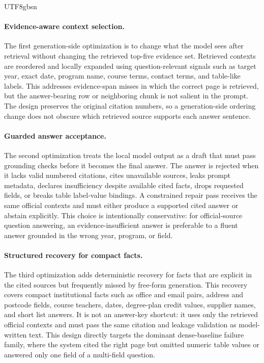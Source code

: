 \documentclass{article}
\begin{document}
\begin{CJK*}{UTF8}{gbsn}
\paragraph{Evidence-aware context selection.}
The first generation-side optimization is to change what the model sees after retrieval without changing the retrieved top-five evidence set. Retrieved contexts are reordered and locally expanded using question-relevant signals such as target year, exact date, program name, course terms, contact terms, and table-like labels. This addresses evidence-span misses in which the correct page is retrieved, but the answer-bearing row or neighboring chunk is not salient in the prompt. The design preserves the original citation numbers, so a generation-side ordering change does not obscure which retrieved source supports each answer sentence.

\paragraph{Guarded answer acceptance.}
The second optimization treats the local model output as a draft that must pass grounding checks before it becomes the final answer. The answer is rejected when it lacks valid numbered citations, cites unavailable sources, leaks prompt metadata, declares insufficiency despite available cited facts, drops requested fields, or breaks table label-value bindings. A constrained repair pass receives the same official contexts and must either produce a supported cited answer or abstain explicitly. This choice is intentionally conservative: for official-source question answering, an evidence-insufficient answer is preferable to a fluent answer grounded in the wrong year, program, or field.

\paragraph{Structured recovery for compact facts.}
The third optimization adds deterministic recovery for facts that are explicit in the cited sources but frequently missed by free-form generation. This recovery covers compact institutional facts such as office and email pairs, address and postcode fields, course teachers, dates, degree-plan credit values, supplier names, and short list answers. It is not an answer-key shortcut: it uses only the retrieved official contexts and must pass the same citation and leakage validation as model-written text. This design directly targets the dominant dense-baseline failure family, where the system cited the right page but omitted numeric table values or answered only one field of a multi-field question.


\end{CJK*}
\end{document}

